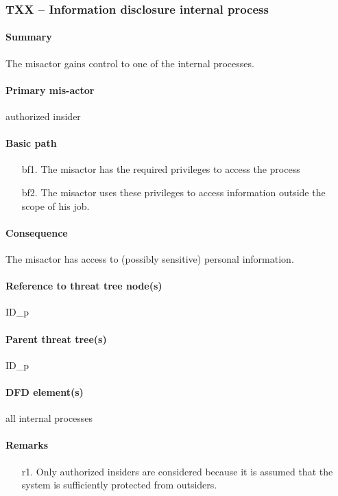 \subsubsection{TXX -- Information disclosure internal process} %

\paragraph{Summary} The misactor gains control to one of the internal processes.

\paragraph{Primary mis-actor} authorized insider

\paragraph{Basic path}
\begin{enumerate}
	\item[bf1.] The misactor has the required privileges to access the process
	\item[bf2.] The misactor uses these privileges to access information outside
	the scope of his job.
\end{enumerate}

\paragraph{Consequence} The misactor has access to (possibly sensitive)
personal information.

\paragraph{Reference to threat tree node(s)} ID_p

\paragraph{Parent threat tree(s)} ID_p

\paragraph{DFD element(s)} all internal processes

\paragraph{Remarks}
\begin{enumerate}
     \item[r1.] Only authorized insiders are considered because it is assumed
     that the system is sufficiently protected from outsiders. 
\end{enumerate}
